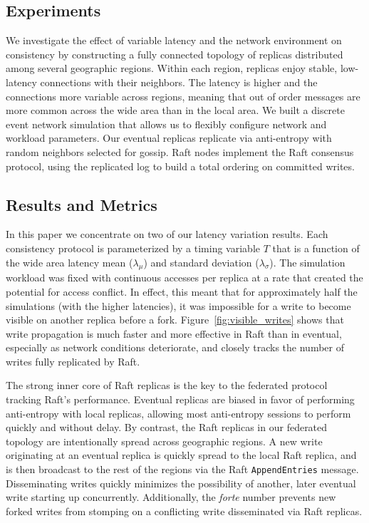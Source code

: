 \documentclass[conference,letterpaper]{IEEEtran}
\begin{document}
\subsection{Experiments}

We investigate the effect of variable latency and the network environment on consistency
by constructing a fully connected topology of replicas distributed among several
geographic regions.
Within each region, replicas enjoy stable, low-latency connections with their neighbors.
The latency is higher and the connections more variable across regions, meaning that out
of order messages are more common across the wide area than in the local area.
We built a discrete event network simulation that allows us to flexibly configure network
and workload parameters.
Our eventual replicas replicate via anti-entropy with random neighbors selected for
gossip.
Raft nodes implement the Raft consensus protocol, using the replicated log to build a
total ordering on committed writes.

\subsection{Results and Metrics}

In this paper we concentrate on two of our latency variation results.
Each consistency protocol is parameterized by a timing variable $T$ that is a function of
the wide area latency mean ($\lambda_{\mu}$) and standard deviation ($\lambda_{\sigma}$).
The simulation workload was fixed with continuous accesses per replica
at a rate that created the potential for access conflict.
In effect, this meant that for approximately half the simulations (with the higher
latencies), it was impossible for a write to become visible on another replica before a
fork.
Figure~\ref{fig:visible_writes} shows that
write propagation is much faster and more effective in Raft than in eventual,
especially as network conditions deteriorate, and
closely tracks the number of writes fully
replicated by Raft.

The strong inner core of Raft replicas is the key to the federated protocol
tracking Raft's performance.
Eventual replicas are biased in favor of performing anti-entropy with local
replicas, allowing most anti-entropy sessions to perform quickly and without
delay.
By contrast, the Raft replicas in our federated topology are intentionally
spread across geographic regions.
A new write originating at an eventual replica is quickly spread to the local
Raft replica, and is then broadcast to the rest of the regions via the Raft
\texttt{AppendEntries} message.
Disseminating writes quickly minimizes the possibility of another, later
eventual write starting up concurrently.
Additionally, the \textit{forte} number prevents new forked writes from stomping on a
conflicting write disseminated via Raft replicas.
\end{document}
